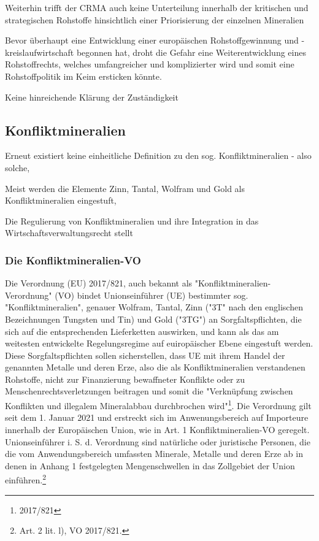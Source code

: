 \documentclass[12pt,a4paper,oneside]{book} %
\begin{document}
Weiterhin trifft der CRMA auch keine Unterteilung innerhalb der kritischen und strategischen Rohstoffe hinsichtlich einer Priorisierung der einzelnen Mineralien

Bevor überhaupt eine Entwicklung einer europäischen Rohstoffgewinnung und -kreislaufwirtschaft begonnen hat, droht die Gefahr eine Weiterentwicklung eines Rohstoffrechts, welches umfangreicher und komplizierter wird und somit eine Rohstoffpolitik im Keim ersticken könnte.

Keine hinreichende Klärung der Zuständigkeit

\subsection{Konfliktmineralien}
Erneut existiert keine einheitliche Definition zu den sog. Konfliktmineralien - also solche, 

Meist werden die Elemente Zinn, Tantal, Wolfram und Gold als Konfliktmineralien eingestuft, 

Die Regulierung von Konfliktmineralien und ihre Integration in das Wirtschaftsverwaltungsrecht stellt 

\subsubsection{Die Konfliktmineralien-VO}
Die Verordnung (EU) 2017/821, auch bekannt als "Konfliktmineralien-Verordnung" (VO) bindet Unionseinführer (UE) bestimmter sog. "Konfliktmineralien", genauer Wolfram, Tantal, Zinn ("3T" nach den englischen Bezeichnungen Tungsten und Tin) und Gold ("3TG") an Sorgfaltspflichten, die sich auf die entsprechenden Lieferketten auswirken, und kann als das am weitesten entwickelte Regelungsregime auf euiropäischer Ebene eingestuft werden\autocite{Kalls, ZfPW 2024, 181, 199}. Diese Sorgfaltspflichten sollen sicherstellen, dass UE mit ihrem Handel der genannten Metalle und deren Erze, also die als Konfliktmineralien verstandenen Rohstoffe, nicht zur Finanzierung bewaffneter Konflikte oder zu Menschenrechtsverletzungen beitragen und somit die "Verknüpfung zwischen Konflikten und illegalem Mineralabbau durchbrochen wird"\footnote{2017/821}. Die Verordnung gilt seit dem 1. Januar 2021 und erstreckt sich im Anwenungsbereich auf Importeure innerhalb der Europäischen Union, wie in Art. 1 Konfliktmineralien-VO geregelt. Unionseinführer i. S. d. Verordnung sind natürliche oder juristische Personen, die die vom Anwendungsbereich umfassten Minerale, Metalle und deren Erze ab in denen in Anhang 1 festgelegten Mengenschwellen in das Zollgebiet der Union einführen.\footnote{Art. 2 lit. l), VO 2017/821.} 
\end{document}
